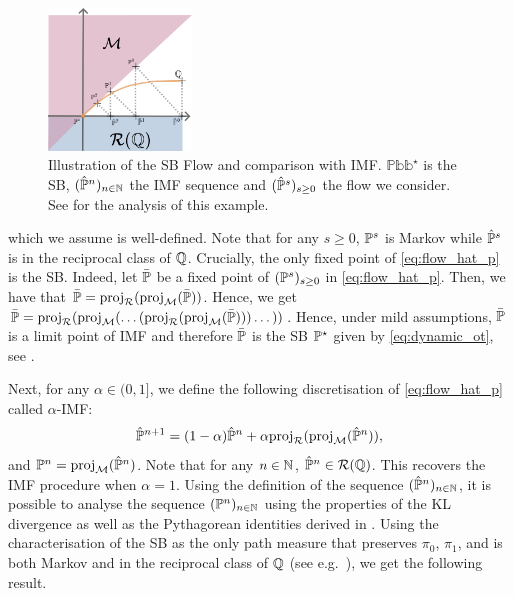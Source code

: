 \documentclass{article}
\begin{document}
\begin{figure}\vspace{-0.6cm}
\centering
    \includegraphics[width=0.34\textwidth]{img/schrodinger_flow.png}
    \caption{Illustration of the SB Flow and comparison with IMF. $\mathbb{Pbb}^\star$ is the SB, $(\hat{\mathbb{P}}^n)_{n \in \mathbb{N}}$ the IMF sequence and $(\hat{\mathbb{P}}^s)_{s \geq 0}$ the flow we consider. See  for the analysis of this example. }
    \label{fig:schrodinger_flow}
\end{figure}

which we assume is well-defined. Note that for any $s \geq 0$, $\mathbb{P}^s$ is Markov while $\hat{\mathbb{P}}^s$ is in the reciprocal class of $\mathbb{Q}$. 
Crucially, the only fixed point of \eqref{eq:flow_hat_p} is the SB. Indeed, let $\bar{\mathbb{P}}$ be a fixed point of $(\mathbb{P}^s)_{s \geq 0}$ in \eqref{eq:flow_hat_p}. Then, we have that $\bar{\mathbb{P}} = \mathrm{proj}_{\mathcal{R}}(\mathrm{proj}_{\mathcal{M}}(\bar{\mathbb{P}}))$. Hence, we get $\bar{\mathbb{P}} = \mathrm{proj}_{\mathcal{R}}(\mathrm{proj}_{\mathcal{M}}(\dots(\mathrm{proj}_{\mathcal{R}}(\mathrm{proj}_{\mathcal{M}}(\bar{\mathbb{P}})))\dots))$. Hence, under mild assumptions, $\bar{\mathbb{P}}$ is a limit point of IMF and therefore $\bar{\mathbb{P}}$ is the SB $\mathbb{P}^\star$ given by \eqref{eq:dynamic_ot}, see \cite[Theorem 2]{peluchetti_diffusion_2023}. 



Next, for any $\alpha \in (0,1]$, we define the following discretisation of \eqref{eq:flow_hat_p} called $\alpha$-IMF:
\begin{equation}
\label{eq:discretisation_flow_path_measure}
        \hat{\Pbb}^{n+1} = (1-\alpha) \hat{\Pbb}^n + \alpha \projsimpleR(\projM(\hat{\Pbb}^n)) ,
\end{equation}
and $\mathbb{P}^n = \mathrm{proj}_{\mathcal{M}}(\hat{\mathbb{P}}^n)$. Note that for any $n \in \mathbb{N}$, $\hat{\mathbb{P}}^n \in \mathcal{R}(\mathbb{Q})$.
This recovers the IMF procedure \citep{shi2023DSBM,peluchetti_diffusion_2023} when $\alpha = 1$.  
Using the definition of the sequence $(\hat{\mathbb{P}}^n)_{n \in \mathbb{N}}$, it is possible to analyse the sequence $(\mathbb{P}^n)_{n \in \mathbb{N}}$ using the properties of the KL divergence as well as the Pythagorean identities derived in \citep{shi2023DSBM,peluchetti_diffusion_2023}. Using the characterisation of the SB as the only path measure that preserves $\pi_0$, $\pi_1$, and is both Markov and in the reciprocal class of $\mathbb{Q}$ (see e.g.~\citep[Theorem 2.12]{leonard2014survey}), we get the following result.
\end{document}
